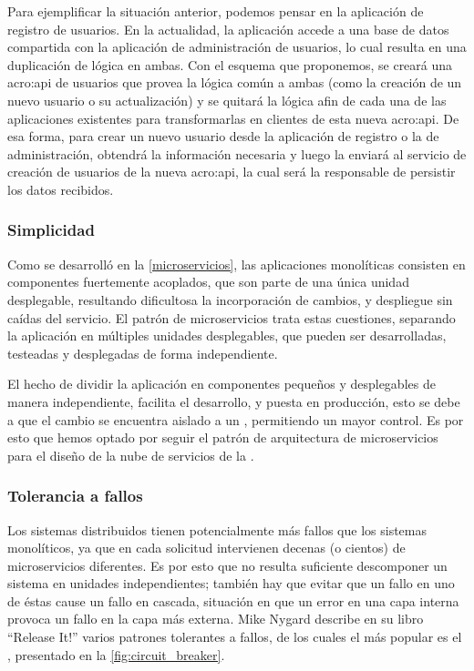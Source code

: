 Para ejemplificar la situación anterior, podemos pensar en la aplicación de registro de usuarios. En la actualidad, la aplicación accede a una base de datos compartida con la aplicación de administración de usuarios, lo cual resulta en una duplicación de lógica en ambas. Con el esquema que proponemos, se creará una \gls{acro:api} de usuarios que provea la lógica común a ambas (como la creación de un nuevo usuario o su actualización) y se quitará la lógica afin de cada una de las aplicaciones existentes para transformarlas en clientes de esta nueva \gls{acro:api}. De esa forma, para crear un nuevo usuario desde la aplicación de registro o la de administración, obtendrá la información necesaria y luego la enviará al servicio de creación de usuarios de la nueva \gls{acro:api}, la cual será la responsable de persistir los datos recibidos.

\subsubsection{Simplicidad}

Como se desarrolló en la \autoref{microservicios}, las aplicaciones monolíticas consisten en componentes fuertemente acoplados, que son parte de una única unidad desplegable, resultando dificultosa la incorporación de cambios,  y despliegue sin caídas del servicio.  El patrón de microservicios trata estas cuestiones, separando la aplicación en múltiples unidades desplegables, que pueden ser desarrolladas, testeadas y desplegadas de forma independiente.

El hecho de dividir la aplicación en componentes pequeños y desplegables de manera independiente, facilita el desarrollo,  y puesta en producción, esto se debe a que el cambio se encuentra aislado a un , permitiendo un mayor control.  Es por esto que hemos optado por seguir el patrón de arquitectura de microservicios para el diseño de la nube de servicios de la {\unlp}.

\subsubsection{Tolerancia a fallos}

Los sistemas distribuidos tienen potencialmente más fallos que los sistemas monolíticos, ya que en cada solicitud intervienen decenas (o cientos) de microservicios diferentes\cite[p.~48]{stin2015}. Es por esto que no resulta suficiente descomponer un sistema en unidades independientes; también hay que evitar que un fallo en uno de éstas cause un fallo en cascada\cite[p.~4]{stin2015}, situación en que un error en una capa interna provoca un fallo en la capa más externa\cite[p.~65]{nygard2007}. Mike Nygard describe en su libro ``Release It!''\cite{nygard2007} varios patrones tolerantes a fallos, de los cuales el más popular es el , presentado en la \autoref{fig:circuit_breaker}.


